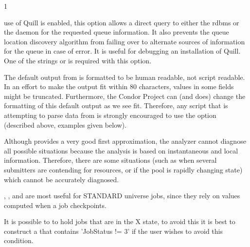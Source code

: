 \begin{ManPage}{\label{man-condor-q}}{1}
\begin{Options}
{    use of Quill is enabled, this option allows a direct query to either
    the rdbms or the 
    daemon for the requested queue information.
    It also prevents the queue location discovery algorithm
    from failing over to alternate sources of information for the queue
    in case of error. It is useful for debugging an installation
    of Quill. One of the strings  or
     is required with this option.}
\end{Options}

\GenRem

The default output from  is formatted to be human readable,
not script readable.
In an effort to make the output fit within 80 characters, values in
some fields might be truncated.
Furthermore, the Condor Project can (and does) change the formatting
of this default output as we see fit.
Therefore, any script that is attempting to parse data from 
is strongly encouraged to use the  option (described
above, examples given below).

Although  provides a very good first approximation, the analyzer 
cannot diagnose all possible situations because the analysis is based on 
instantaneous and local information.  Therefore, there are some situations 
(such as when several submitters are contending for resources, or if the pool 
is rapidly changing state) which cannot be accurately diagnosed.

, , and  are most useful for STANDARD
universe jobs, since they rely on values computed when a job
checkpoints.

It is possible to to hold jobs that are in the X state, to avoid this it 
is best to construct a  that contains
'JobStatus != 3' if the user wishes to avoid this condition. 


\end{ManPage}
